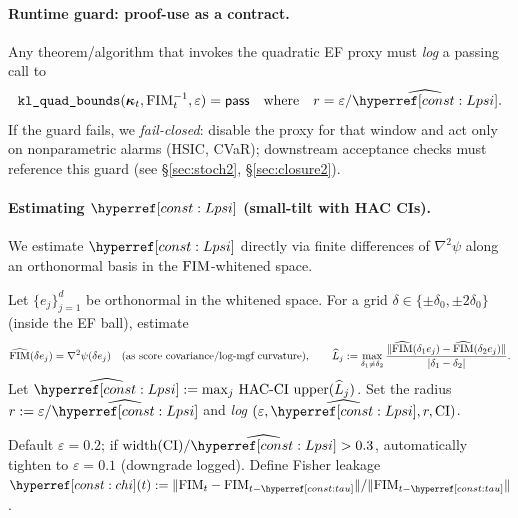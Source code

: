 \paragraph{Runtime guard: proof-use as a contract.}
Any theorem/algorithm that invokes the quadratic EF proxy must \emph{log} a passing call to
\[
\texttt{kl\_quad\_bounds}(\bm\kappa_t,\FIM_t^{-1},\varepsilon)=\textsf{pass}
\quad\text{where}\quad r=\varepsilon/\widehat{\constref{Lpsi}}.
\]
If the guard fails, we \emph{fail-closed}: disable the proxy for that window and act only on nonparametric alarms (HSIC, CVaR); downstream acceptance checks must reference this guard (see \S\ref{sec:stoch2}, \S\ref{sec:closure2}).

\paragraph{Estimating $\constref{Lpsi}$ (small-tilt with HAC CIs).}
We estimate $\constref{Lpsi}$ directly via finite differences of $\nabla^2\psi$ along an orthonormal basis in the $\mathrm{FIM}$-whitened space.

\begin{definition}\label{def:Lpsi-est}
\emph{}
Let $\{e_j\}_{j=1}^d$ be orthonormal in the whitened space. For a grid $\delta\in\{\pm\delta_0,\pm2\delta_0\}$ (inside the EF ball), estimate
\[
\widehat{\mathrm{FIM}}(\delta e_j)=\nabla^2\psi(\delta e_j)\quad(\text{as score covariance/log-mgf curvature}),
\qquad
\widehat{L}_j:=\max_{\delta_1\neq\delta_2}\frac{\|\widehat{\mathrm{FIM}}(\delta_1 e_j)-\widehat{\mathrm{FIM}}(\delta_2 e_j)\|}{|\delta_1-\delta_2|}.
\]
Let $\widehat{\constref{Lpsi}}:=\max_j\,\mathrm{HAC\text{-}CI\ upper}(\widehat{L}_j)$.
Set the radius $r:=\varepsilon/\widehat{\constref{Lpsi}}$ and \emph{log} $(\varepsilon,\widehat{\constref{Lpsi}},r,\text{CI})$.
\end{definition}

\begin{remark}\label{rem:eps-policy}
Default $\varepsilon=0.2$; if $\mathrm{width}(\text{CI})/\widehat{\constref{Lpsi}}>0.3$, automatically tighten to $\varepsilon=0.1$ (downgrade logged).
Define Fisher leakage $\constref{chi}(t):=\|\FIM_{t}-\FIM_{t-\constref{tau}}\|/\|\FIM_{t-\constref{tau}}\|$.
\end{remark}

